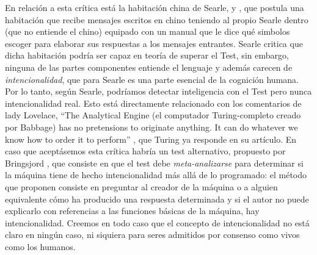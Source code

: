 \documentclass[12pt]{memoir}
\begin{document}
En relación a esta crítica está la habitación china de Searle, \parencite{searleChineseRoom} y \parencite[apartado 4.2]{afterTuring}, que postula una habitación que recibe mensajes escritos en chino teniendo al propio Searle dentro (que no entiende el chino) equipado con un manual que le dice qué simbolos escoger para elaborar sus respuestas a los mensajes entrantes. Searle critica que dicha habitación podría ser capaz en teoría de superar el Test, sin embargo, ninguna de las partes componentes entiende el lenguaje y además carecen de \textit{intencionalidad}, que para Searle es una parte esencial de la cognición humana. Por lo tanto, según Searle, podríamos detectar inteligencia con el Test pero nunca intencionalidad real. Esto está directamente relacionado con los comentarios de lady Lovelace, ``The Analytical Engine (el computador Turing-completo creado por Babbage) has no pretensions to originate anything. It can do whatever we know how to order it to perform'' \parencite[apartado 2.6]{sep-turing-test}, que Turing ya responde en su artículo. En caso que aceptásemos esta crítica habría un test alternativo, propuesto por Bringsjord \parencite[apartado 5.3.2]{sep-turing-test}, que consiste en que el test debe \textit{meta-analizarse} para determinar si la máquina tiene de hecho intencionalidad más allá de lo programado: el método que proponen consiste en preguntar al creador de la máquina o a alguien equivalente cómo ha producido una respuesta determinada y si el autor no puede explicarlo con referencias a las funciones básicas de la máquina, hay intencionalidad. Creemos en todo caso que el concepto de intencionalidad no está claro en ningún caso, ni siquiera para seres admitidos por consenso como vivos como los humanos.
\end{document}
